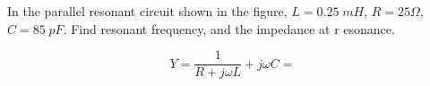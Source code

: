% 
% 

\item In the parallel resonant circuit shown in the figure, $L=0.25\;mH$,
$R=25\Omega$, $C=85\;pF$. Find resonant frequency, and the impedance at r
esonance.


\[	Y=\frac{1}{R+j\omega L}+j\omega C=	\]



